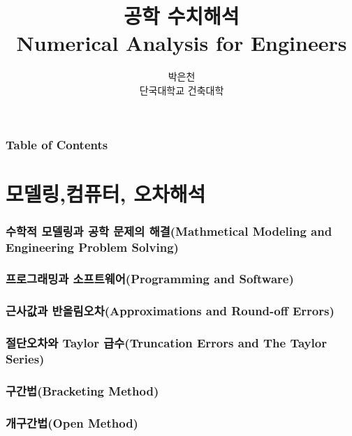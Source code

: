 \documentclass{article}
\title{공학 수치해석\\Numerical Analysis for Engineers}
\author{
박은천\\단국대학교 건축대학
}
\makeatletter
\numberwithin{equation}{section}
\numberwithin{figure}{section}
\numberwithin{table}{section}
\numberwithin{algorithm}{section}
\theoremstyle{examplestyle}
\let\\\tabularnewline
\let\\\tabularnewline
\renewcommand{\tableofcontents}[1][\contentsname]{%
  \section*{#1}
  \begin{multicols}{2}
    \@starttoc{toc}
  \end{multicols}
}
\makeatother
\begin{document}
\makecover
\maketitle
\tableofcontents[Table of Contents]

\clearpage
\part{모델링,컴퓨터, 오차해석}\label{part1}
\section{수학적 모델링과 공학 문제의 해결\\(Mathmetical Modeling and Engineering Problem Solving)}


\clearpage
\section{프로그래밍과 소프트웨어\\(Programming and Software)}


\clearpage
\section{근사값과 반올림오차\\(Approximations and Round-off Errors)}


\clearpage
\section{절단오차와 Taylor 급수\\(Truncation Errors and The Taylor Series)}


\clearpage
\section{구간법\\(Bracketing Method)}\label{sec:brack}


\clearpage
\section{개구간법\\(Open Method)}\label{sec:open}

\end{document}
